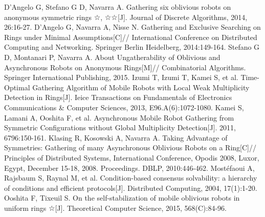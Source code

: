 \begin{thebibliography}{0}
   D'Angelo G, Stefano G D, Navarra A. Gathering six oblivious robots on anonymous symmetric rings ☆, ☆☆[J]. Journal of Discrete Algorithms, 2014, 26:16-27.
   D’Angelo G, Navarra A, Nisse N. Gathering and Exclusive Searching on Rings under Minimal Assumptions[C]// International Conference on Distributed Computing and Networking. Springer Berlin Heidelberg, 2014:149-164.
   Stefano G D, Montanari P, Navarra A. About Ungatherability of Oblivious and Asynchronous Robots on Anonymous Rings[M]// Combinatorial Algorithms. Springer International Publishing, 2015.
   Izumi T, Izumi T, Kamei S, et al. Time-Optimal Gathering Algorithm of Mobile Robots with Local Weak Multiplicity Detection in Rings[J]. Ieice Transactions on Fundamentals of Electronics Communications & Computer Sciences, 2013, E96.A(6):1072-1080.
   Kamei S, Lamani A, Ooshita F, et al. Asynchronous Mobile Robot Gathering from Symmetric Configurations without Global Multiplicity Detection[J]. 2011, 6796:150-161.
   Klasing R, Kosowski A, Navarra A. Taking Advantage of Symmetries: Gathering of many Asynchronous Oblivious Robots on a Ring[C]// Principles of Distributed Systems, International Conference, Opodis 2008, Luxor, Egypt, December 15-18, 2008. Proceedings. DBLP, 2010:446-462.
   Mostéfaoui A, Rajsbaum S, Raynal M, et al. Condition-based consensus solvability: a hierarchy of conditions and efficient protocols[J]. Distributed Computing, 2004, 17(1):1-20.
   Ooshita F, Tixeuil S. On the self-stabilization of mobile oblivious robots in uniform rings ☆[J]. Theoretical Computer Science, 2015, 568(C):84-96.
\end{thebibliography}
